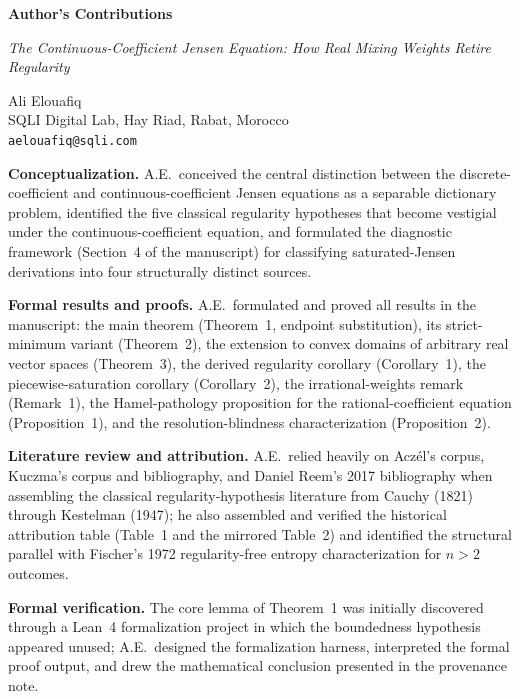 \documentclass{article}
\begin{document}
\thispagestyle{empty}

\begin{center}
{\Large\bfseries Author's Contributions}

\vspace{0.75em}
{\large\itshape The Continuous-Coefficient Jensen Equation:
How Real Mixing Weights Retire Regularity}

\vspace{1em}
{\normalsize Ali Elouafiq}\\
{\small SQLI Digital Lab, Hay Riad, Rabat, Morocco}\\
{\small \texttt{aelouafiq@sqli.com}}
\end{center}

\vspace{1.5em}

\noindent\textbf{Conceptualization.}
A.E.\ conceived the central distinction between the discrete-coefficient
and continuous-coefficient Jensen equations as a separable dictionary
problem, identified the five classical regularity hypotheses that become
vestigial under the continuous-coefficient equation, and formulated the
diagnostic framework (Section~4 of the manuscript) for classifying
saturated-Jensen derivations into four structurally distinct sources.

\medskip
\noindent\textbf{Formal results and proofs.}
A.E.\ formulated and proved all results in the manuscript: the main
theorem (Theorem~1, endpoint substitution), its strict-minimum variant
(Theorem~2), the extension to convex domains of arbitrary real vector
spaces (Theorem~3), the derived regularity corollary (Corollary~1),
the piecewise-saturation corollary (Corollary~2), the irrational-weights
remark (Remark~1), the Hamel-pathology proposition for the
rational-coefficient equation (Proposition~1), and the
resolution-blindness characterization (Proposition~2).

\medskip
\noindent\textbf{Literature review and attribution.}
A.E.\ relied heavily on Acz\'el's corpus, Kuczma's corpus and
bibliography, and Daniel Reem's 2017 bibliography when assembling the
classical regularity-hypothesis literature from Cauchy (1821) through
Kestelman (1947); he also assembled and verified the historical
attribution table (Table~1 and the mirrored Table~2) and identified the
structural parallel with Fischer's 1972 regularity-free entropy
characterization for $n > 2$ outcomes.

\medskip
\noindent\textbf{Formal verification.}
The core lemma of Theorem~1 was initially discovered through a Lean~4
formalization project in which the boundedness hypothesis appeared
unused; A.E.\ designed the formalization harness, interpreted the
formal proof output, and drew the mathematical conclusion presented in
the provenance note.
\end{document}
